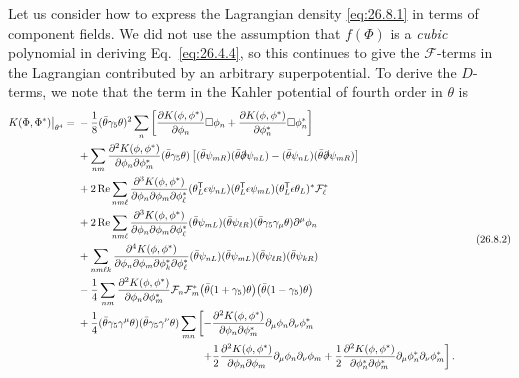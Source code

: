 Let us consider how to express the Lagrangian density \eqref{eq:26.8.1} in
terms of component fields. We did not use the assumption that \(f(\Phi)\) is
a \textit{cubic} polynomial in deriving Eq.~\eqref{eq:26.4.4}, so this
continues to give the \(\mathcal{F}\)-terms in the Lagrangian contributed by
an arbitrary superpotential. To derive the \(D\)-terms, we note that the term
in the Kahler potential of fourth order in \(\theta\) is
\begin{equation}
  \begin{aligned}
  K(\Phi,\Phi^*)\big|_{\theta^4}
  ={}&
  -\frac18(\bar\theta\gamma_5\theta)^2
  \sum_n\left[
    \frac{\partial K(\phi,\phi^*)}{\partial\phi_n}\Box\phi_n
    +\frac{\partial K(\phi,\phi^*)}{\partial\phi_n^*}\Box\phi_n^*
  \right]
  \\
  &+\sum_{nm}
  \frac{\partial^2K(\phi,\phi^*)}
       {\partial\phi_n\partial\phi_m^*}
  (\bar\theta\gamma_5\theta)
  \left[
    (\bar\theta\psi_{mR})(\bar\theta\sl{\partial}\psi_{nL})
    -(\bar\theta\psi_{nL})(\bar\theta\sl{\partial}\psi_{mR})
  \right]
  \\
  &+2\operatorname{Re}\sum_{nm\ell}
  \frac{\partial^3K(\phi,\phi^*)}
       {\partial\phi_n\partial\phi_m\partial\phi_\ell^*}
  (\theta_L^{\mathsf T}\epsilon\psi_{nL})
  (\theta_L^{\mathsf T}\epsilon\psi_{mL})
  (\theta_L^{\mathsf T}\epsilon\theta_L)^*\mathcal{F}_\ell^*
  \\
  &+2\operatorname{Re}\sum_{nm\ell}
  \frac{\partial^3K(\phi,\phi^*)}
       {\partial\phi_n\partial\phi_m\partial\phi_\ell^*}
  (\bar\theta\psi_{mL})(\bar\theta\psi_{\ell R})
  (\bar\theta\gamma_5\gamma_\mu\theta)\partial^\mu\phi_n
  \\
  &+\sum_{nm\ell k}
  \frac{\partial^4K(\phi,\phi^*)}
       {\partial\phi_n\partial\phi_m
        \partial\phi_k^*\partial\phi_\ell^*}
  (\bar\theta\psi_{nL})(\bar\theta\psi_{mL})
  (\bar\theta\psi_{\ell R})(\bar\theta\psi_{kR})
  \\
  &-\frac14\sum_{nm}
  \frac{\partial^2K(\phi,\phi^*)}
       {\partial\phi_n\partial\phi_m^*}
  \mathcal{F}_n\mathcal{F}_m^*
  \bigl(\bar\theta(1+\gamma_5)\theta\bigr)
  \bigl(\bar\theta(1-\gamma_5)\theta\bigr)
  \\
  &+\frac14
  (\bar\theta\gamma_5\gamma^\mu\theta)
  (\bar\theta\gamma_5\gamma^\nu\theta)
  \sum_{mn}\left[
    -\frac{\partial^2K(\phi,\phi^*)}
          {\partial\phi_n\partial\phi_m^*}
      \partial_\mu\phi_n\partial_\nu\phi_m^*
  \right.
  \\
  &\hspace{41mm}\left.
    +\frac12
      \frac{\partial^2K(\phi,\phi^*)}
           {\partial\phi_n\partial\phi_m}
      \partial_\mu\phi_n\partial_\nu\phi_m
    +\frac12
      \frac{\partial^2K(\phi,\phi^*)}
           {\partial\phi_n^*\partial\phi_m^*}
      \partial_\mu\phi_n^*\partial_\nu\phi_m^*
  \right] .
  \end{aligned}
  \tag{26.8.2}\label{eq:26.8.2}
\end{equation}
